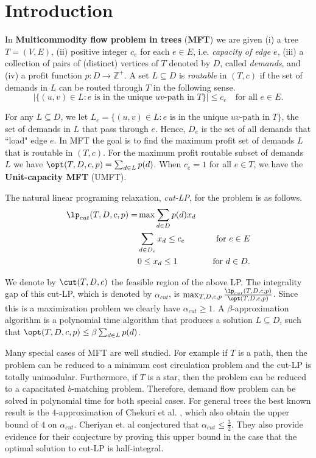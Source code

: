 
\section{Introduction}





In \textbf{Multicommodity flow problem in
	trees} (\textbf{MFT}) we are given (i) a tree $T=(V,E)$, (ii) positive integer $c_e$ for each $e\in E$, i.e. \textit{capacity of edge $e$}, (iii) a collection of pairs of (distinct) vertices of $T$ denoted by $D$, called \textit{demands}, and (iv) a profit function $p:D\rightarrow \mathbb{Z}^+$. A set $L\subseteq D$ is  \textit{routable } in $(T,c)$ if the set of demands in $L$ can be routed through $T$ in the following sense.
\begin{equation}
|\{(u,v)\in L: \mbox{$e$ is in the unique $uv$-path in $T$}\}|\leq c_e \quad \mbox{for all $e\in E$}.\end{equation}

For any $L\subseteq D$, we let $L_e=\{(u,v)\in L: \mbox{$e$ is in the unique $uv$-path in $T$}\}$, the set of demands in $L$ that pass through $e$. Hence, $D_e$ is the set of all demands  that ``load" edge $e$. In MFT the goal is to find the maximum profit set of demands $L$ that is routable in $(T,c)$. For the maximum profit routable subset of demands $L$ we have $\opt(T,D,c,p)= \sum_{d \in L}p(d)$. When $c_e=1$ for all $e\in T$, we have the \textbf{Unit-capacity MFT} (UMFT). 

The natural linear programing relaxation, \textit{cut-LP}, for the problem is as follows.
\begin{align}
\lp_{cut}(T,D,c,p)=&\max \sum_{d\in D} p(d) x_d&\\
&\sum_{d\in D_e}x_d \leq c_e &\quad\text{for } e\in E\\
&0\leq x_d \leq 1 &\quad\text{for } d\in D.
\end{align}

We denote by $\cut(T,D,c)$ the feasible region of the above LP. The integrality gap of this cut-LP, which is denoted by $\alpha_{cut}$, 
is $\max_{T,D,c,p} \frac{\lp_{cut} (T,D,c,p)}{\opt (T,D,c,p)}$. Since this is a maximization problem we clearly have $\alpha_{cut}\geq 1$. A $\beta$-approximation algorithm is a polynomial time algorithm that produces a solution $L\subseteq D$, such that $\opt(T,D,c,p)\leq \beta \sum_{d \in L} p(d)$. 

Many special cases of MFT are well studied. For example if $T$ is a path, then the problem can be reduced to a minimum cost circulation problem and the cut-LP is totally unimodular. Furthermore, if $T$ is a star, then the problem can be reduced to a capacitated $b$-matching problem. Therefore, demand flow problem can be solved in polynomial time for both special cases. For general trees the best known result is the $4$-approximation of Chekuri et al. \cite{Chekuri}, which also obtain the upper bound of $4$ on $\alpha_{cut}$. Cheriyan et. al \cite{Cheriyan1999} conjectured that $\alpha_{cut}\leq \frac{3}{2}$. They also provide evidence for their conjecture by proving this upper bound in the case that the optimal solution to cut-LP is half-integral.


